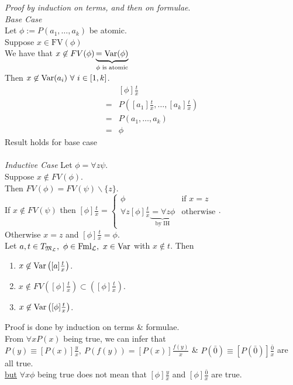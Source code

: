 \documentclass[11pt,a4paper]{article}
\begin{document}
\textit{Proof by induction on terms, and then on formulae}.\\
\textit{Base Case}\\
Let $\phi:=P(a_1,\dots,a_k)$ be atomic.\\
Suppose $x\in\text{FV}(\phi)$\\
We have that $x\not\in FV(\phi)\underbrace{=\mathrm{Var}(\phi)}_{\phi\text{ is atomic}}$\\
Then $x\not\in\var(a_i)\ \forall\ i\in[1,k]$.
\[\begin{array}{rl}
&[\phi]\frac{t}x\\
=&P([a_1]\frac{t}x,\dots,[a_k]\frac{t}x)\\
=&P(a_1,\dots,a_k)\\
=&\phi
\end{array}\]
Result holds for base case\\
\\
\textit{Inductive Case}
Let $\phi=\forall z\psi$.\\
Suppose $x\not\in FV(\phi)$.\\
Then $FV(\phi)=FV(\psi)\backslash\{z\}$.\\
If $x\not\in FV(\psi)$ then $[\phi]\frac{t}x=\begin{cases}\phi&\text{if }x=z\\\forall z[\phi]\frac{t}{x}\underbrace{=\forall z\phi}_\text{by IH}&\text{otherwise}\end{cases}$.\\
Otherwise $x=z$ and $[\phi]\frac{t}x=\phi$.\\

\proposition{}
Let $a,t\in T_{\M_\LL},\ \phi\in\text{Fml}_\LL,\ x\in\var$ with $x\not\in t$. Then
\begin{enumerate}
	\item $x\not\in\mathrm{Var}\left([a]\frac{t}{x}\right)$.
	\item $x\not\in FV\left([\phi]\frac{t}{x}\right)\subset\left([\phi]\frac{t}{x}\right)$.
	\item $x\not\in\mathrm{Var}\left([\phi]\frac{t}{x}\right)$.
\end{enumerate}
\nb Proof is done by induction on terms \& formulae.\\

\remark{}
From $\forall xP(x)$ being true, we can infer that $P(y)\equiv[P(x)]\frac{y}x,\ P(f(y))=[P(x)]\frac{f(y)}x$ \& ${P(\bar0)\equiv[P(\bar0)]\frac{\bar0}x}$ are all true.\\
\underline{but} $\forall x\phi$ being true does not mean that $[\phi]\frac{y}x$ and $[\phi]\frac{\bar0}x$ are true.\\
\end{document}
